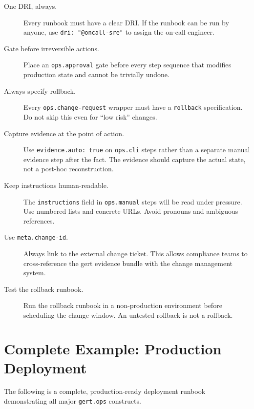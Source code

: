\begin{description}
  \item[One DRI, always.] Every runbook must have a clear DRI. If the runbook can be run
    by anyone, use \texttt{dri: "@oncall-sre"} to assign the on-call engineer.
  \item[Gate before irreversible actions.] Place an \texttt{ops.approval} gate before every
    step sequence that modifies production state and cannot be trivially undone.
  \item[Always specify rollback.] Every \texttt{ops.change-request} wrapper must have a
    \texttt{rollback} specification. Do not skip this even for ``low risk'' changes.
  \item[Capture evidence at the point of action.] Use \texttt{evidence.auto: true} on
    \texttt{ops.cli} steps rather than a separate manual evidence step after the fact. The
    evidence should capture the actual state, not a post-hoc reconstruction.
  \item[Keep instructions human-readable.] The \texttt{instructions} field in
    \texttt{ops.manual} steps will be read under pressure. Use numbered lists and concrete
    URLs. Avoid pronouns and ambiguous references.
  \item[Use \texttt{meta.change-id}.] Always link to the external change ticket. This
    allows compliance teams to cross-reference the gert evidence bundle with the change
    management system.
  \item[Test the rollback runbook.] Run the rollback runbook in a non-production environment
    before scheduling the change window. An untested rollback is not a rollback.
\end{description}

\section{Complete Example: Production Deployment}
\label{sec:authoring-complete-example}

The following is a complete, production-ready deployment runbook demonstrating all major
\texttt{gert.ops} constructs.

